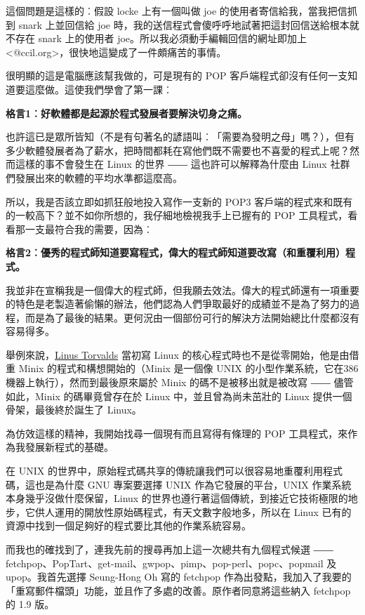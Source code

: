 \documentclass[12pt, a5paper]{book}
\begin{document}
這個問題是這樣的︰假設 locke 上有一個叫做 joe
的使用者寄信給我，當我把信抓到 snark 上並回信給 joe
時，我的送信程式會傻呼呼地試著把這封回信送給根本就不存在 snark
上的使用者 joe。所以我必須動手編輯回信的網址即加上
\textless{}@ccil.org\textgreater{}，很快地這變成了一件頗痛苦的事情。

很明顯的這是電腦應該幫我做的，可是現有的 POP
客戶端程式卻沒有任何一支知道要這麼做。這使我們學會了第一課︰

\textbf{格言1︰好軟體都是起源於程式發展者要解決切身之痛。}

也許這已是眾所皆知（不是有句著名的諺語叫︰「需要為發明之母」嗎？），但有多少軟體發展者為了薪水，把時間都耗在寫他們既不需要也不喜愛的程式上呢？然而這樣的事不會發生在
Linux 的世界 ―― 這也許可以解釋為什麼由 Linux
社群們發展出來的軟體的平均水準都這麼高。

所以，我是否該立即如抓狂般地投入寫作一支新的 POP3
客戶端的程式來和既有的一較高下？並不如你所想的，我仔細地檢視我手上已握有的
POP 工具程式，看看那一支最符合我的需要，因為︰

\textbf{格言2︰優秀的程式師知道要寫程式，偉大的程式師知道要改寫（和重覆利用）程式。}

我並非在宣稱我是一個偉大的程式師，但我願去效法。偉大的程式師還有一項重要的特色是老製造著偷懶的辦法，他們認為人們爭取最好的成績並不是為了努力的過程，而是為了最後的結果。更何況由一個部份可行的解決方法開始總比什麼都沒有容易得多。

舉例來說，\href{http://www.tuxedo.org/~esr/faqs/linus}{Linus Torvalds}
當初寫 Linux 的核心程式時也不是從零開始，他是由借重 Minix
的程式和構想開始的（Minix 是一個像 UNIX
的小型作業系統，它在386機器上執行），然而到最後原來屬於 Minix
的碼不是被移出就是被改寫 ―― 儘管如此，Minix 的碼畢竟曾存在於 Linux
中，並且曾為尚未茁壯的 Linux 提供一個骨架，最後終於誕生了 Linux。

為仿效這樣的精神，我開始找尋一個現有而且寫得有條理的 POP
工具程式，來作為我發展新程式的基礎。

在 UNIX
的世界中，原始程式碼共享的傳統讓我們可以很容易地重覆利用程式碼，這也是為什麼
GNU 專案要選擇 UNIX 作為它發展的平台，UNIX
作業系統本身幾乎沒做什麼保留，Linux
的世界也遵行著這個傳統，到接近它技術極限的地步，它供人運用的開放性原始碼程式，有天文數字般地多，所以在
Linux 已有的資源中找到一個足夠好的程式要比其他的作業系統容易。

而我也的確找到了，連我先前的搜尋再加上這一次總共有九個程式候選 ――
fetchpop、PopTart、get-mail、gwpop、pimp、pop-perl、popc、popmail 及
upop。我首先選擇 Seung-Hong Oh 寫的 fetchpop
作為出發點，我加入了我要的「重寫郵件檔頭」功能，並且作了多處的改善。原作者同意將這些納入
fetchpop 的 1.9 版。
\end{document}
